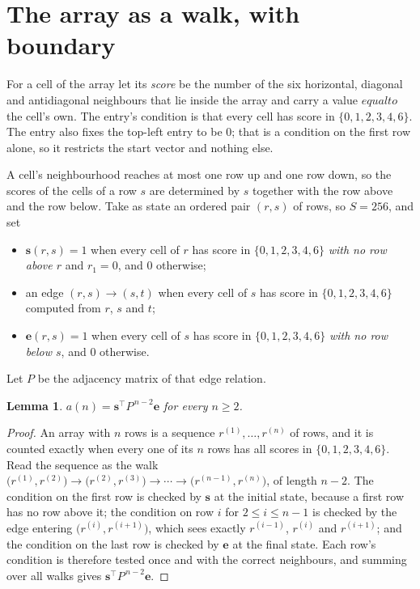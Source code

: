 \documentclass[11pt,a4paper]{article}
\theoremstyle{plain}
\newtheorem{lemma}[theorem]{Lemma}
\theoremstyle{definition}
\begin{document}
\section{The array as a walk, with boundary}

For a cell of the array let its \emph{score} be the number of the six horizontal, diagonal and antidiagonal neighbours that lie inside
the array and carry a value $equal to$ the cell's own. The entry's condition is that every cell
has score in $\{0,1,2,3,4,6\}$. The entry also fixes the top-left entry to be $0$; that is a condition on the first row alone, so it restricts the start vector and nothing else.

A cell's neighbourhood reaches at most one row up and one row down, so the scores of the
cells of a row $s$ are determined by $s$ together with the row above and the row below.
Take as state an ordered pair $(r,s)$ of rows, so $S=256$, and set
\begin{itemize}
\item $\mathbf{s}(r,s)=1$ when every cell of $r$ has score in $\{0,1,2,3,4,6\}$ \emph{with no row
above $r$} and $r_1=0$, and $0$ otherwise;
\item an edge $(r,s)\to(s,t)$ when every cell of $s$ has score in $\{0,1,2,3,4,6\}$ computed from
$r$, $s$ and $t$;
\item $\mathbf{e}(r,s)=1$ when every cell of $s$ has score in $\{0,1,2,3,4,6\}$ \emph{with no row
below $s$}, and $0$ otherwise.
\end{itemize}
Let $P$ be the adjacency matrix of that edge relation.

\begin{lemma}\label{lem:walk}
$a(n)=\mathbf{s}^{\!\top}P^{\,n-2}\mathbf{e}$ for every $n\ge2$.
\end{lemma}

\begin{proof}
An array with $n$ rows is a sequence $r^{(1)},\dots,r^{(n)}$ of rows, and it is counted
exactly when every one of its $n$ rows has all scores in $\{0,1,2,3,4,6\}$. Read the sequence as the
walk $\bigl(r^{(1)},r^{(2)}\bigr)\to\bigl(r^{(2)},r^{(3)}\bigr)\to\cdots\to
\bigl(r^{(n-1)},r^{(n)}\bigr)$, of length $n-2$. The condition on the first row is
checked by $\mathbf{s}$ at the initial state, because a first row has no row above it; the
condition on row $i$ for $2\le i\le n-1$ is checked by the edge entering
$\bigl(r^{(i)},r^{(i+1)}\bigr)$, which sees exactly $r^{(i-1)}$, $r^{(i)}$ and
$r^{(i+1)}$; and the condition on the last row is checked by $\mathbf{e}$ at the final
state. Each row's condition is therefore tested once and with the correct neighbours, and
summing over all walks gives $\mathbf{s}^{\!\top}P^{\,n-2}\mathbf{e}$.
\end{proof}
\end{document}
